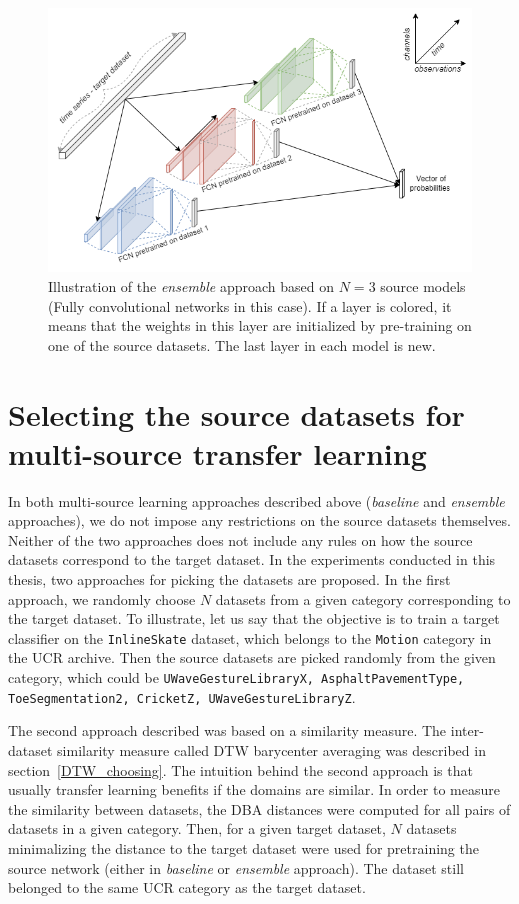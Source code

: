 \documentclass[a4paper,11pt,twoside]{report}
\theoremstyle{definition}
\begin{document}
\FloatBarrier
\begin{figure}[h!]
\centering
\includegraphics[width=17cm]{imgs/ensemble_architecture.png}
\caption{Illustration of the\textit{ ensemble }approach based on $N=3$ source models (Fully convolutional networks in this case). If a layer is colored, it means that the weights in this layer are initialized by pre-training on one of the source datasets. The last layer in each model is new.}
\label{fig:ensemble_architecture}
\end{figure}

\FloatBarrier


\section{Selecting the source datasets for multi-source transfer learning}\label{section:selecting}
In both multi-source learning approaches described above (\textit{baseline} and \textit{ensemble} approaches), we do not impose any restrictions on the source datasets themselves. Neither of the two approaches does not include any rules on how the source datasets correspond to the target dataset. In the experiments conducted in this thesis, two approaches for picking the datasets are proposed. In the first approach, we randomly choose $N$ datasets from a given category corresponding to the target dataset. To illustrate, let us say that the objective is to train a target classifier on the \texttt{InlineSkate} dataset, which belongs to the \texttt{Motion} category in the UCR archive. Then the source datasets are picked randomly from the given category, which could be \texttt{UWaveGestureLibraryX, AsphaltPavementType, ToeSegmentation2, CricketZ, UWaveGestureLibraryZ}.


The second approach described was based on a similarity measure. The inter-dataset similarity measure called DTW barycenter averaging was described in section~\ref{DTW_choosing}. The intuition behind the second approach is that usually transfer learning benefits if the domains are similar. In order to measure the similarity between datasets, the DBA distances were computed for all pairs of datasets in a given category. Then, for a given target dataset, $N$ datasets minimalizing the distance to the target dataset were used for pretraining the source network (either in \textit{baseline} or \textit{ensemble} approach). The dataset still belonged to the same UCR category as the target dataset.
\end{document}
